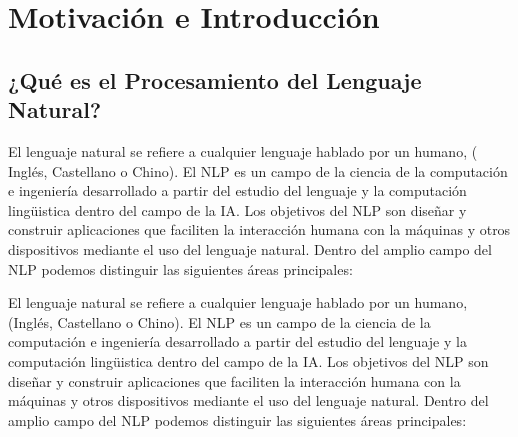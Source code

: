 \chapter{Motivación e Introducción}\label{ch:introduction}

\section{¿Qué es el Procesamiento del Lenguaje Natural?}
\label{sec:whatisnlp}

El lenguaje natural se refiere a cualquier lenguaje hablado por un humano, (\eg
Inglés, Castellano o Chino). El \ac{NLP} es un campo de la
ciencia de la computación e ingeniería desarrollado a partir del estudio del
lenguaje y la computación lingüistica dentro del campo de la \ac{IA}. Los
objetivos del \ac{NLP} son diseñar y construir aplicaciones que faciliten la
interacción humana con la máquinas y otros dispositivos mediante el uso del
lenguaje natural. Dentro del amplio campo del \ac{NLP} podemos distinguir las
siguientes áreas principales:

El lenguaje natural %
se refiere a cualquier lenguaje hablado por un humano, (\eg Inglés, Castellano o
Chino). El \ac{NLP} es un campo de la ciencia de la
computación e ingeniería desarrollado a partir del estudio del lenguaje y la
computación lingüistica dentro del campo de la \ac{IA}. Los objetivos del
\ac{NLP} son diseñar y construir aplicaciones que faciliten la interacción
humana con la máquinas y otros dispositivos mediante el uso del lenguaje
natural. Dentro del amplio campo del \ac{NLP} podemos distinguir las siguientes
áreas principales:

